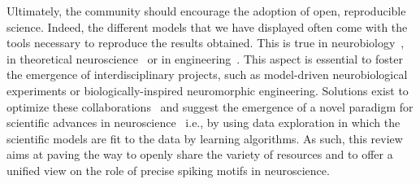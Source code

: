 \documentclass[brainsci, %
               review,submit,pdftex,moreauthors
               ]{Definitions/mdpi}
\begin{document}
Ultimately, the community should encourage the adoption of open, reproducible science. Indeed, the different models that we have displayed often come with the tools necessary to reproduce the results obtained. This is true in neurobiology~\citep{bellec_fitting_2021}, in theoretical neuroscience~\citep{izhikevich_polychronization_2006} or in engineering~\citep{grimaldi_robust_2022}. This aspect is essential to foster the emergence of interdisciplinary projects, such as model-driven neurobiological experiments or biologically-inspired neuromorphic engineering. Solutions exist to optimize these collaborations~\citep{panahi_generative_2021} and suggest the emergence of a novel paradigm for scientific advances in neuroscience~\citep{tolle_fourth_2011} i.e., by using data exploration in which the scientific models are fit to the data by learning algorithms. As such, this review aims at paving the way to openly share the variety of resources and to offer a unified view on the role of precise spiking motifs in neuroscience.
\vspace{6pt} 



\end{document}
